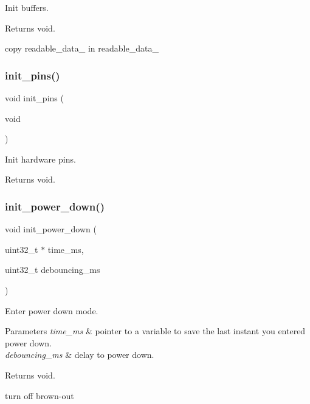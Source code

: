 Init buffers. 

\begin{DoxyReturn}{Returns}
void. 
\end{DoxyReturn}
copy readable\+\_\+data\+\_ in readable\+\_\+data\+\_ \mbox{\label{i2c-rain_8h_aa9c113540346b54d49b2a596e6ba8480}} 
\subsubsection{\texorpdfstring{init\+\_\+pins()}{init\_pins()}}
{\footnotesize\ttfamily void init\+\_\+pins (\begin{DoxyParamCaption}\item[{void}]{ }\end{DoxyParamCaption})}



Init hardware pins. 

\begin{DoxyReturn}{Returns}
void. 
\end{DoxyReturn}
\mbox{\label{i2c-rain_8h_afb98a0f07c30784284f48271ffe02b97}} 
\subsubsection{\texorpdfstring{init\+\_\+power\+\_\+down()}{init\_power\_down()}}
{\footnotesize\ttfamily void init\+\_\+power\+\_\+down (\begin{DoxyParamCaption}\item[{uint32\+\_\+t $\ast$}]{time\+\_\+ms,  }\item[{uint32\+\_\+t}]{debouncing\+\_\+ms }\end{DoxyParamCaption})}



Enter power down mode. 


\begin{DoxyParams}{Parameters}
{\em time\+\_\+ms} & pointer to a variable to save the last instant you entered power down. \\
\hline
{\em debouncing\+\_\+ms} & delay to power down. \\
\hline
\end{DoxyParams}
\begin{DoxyReturn}{Returns}
void. 
\end{DoxyReturn}
turn off brown-\/out \mbox{\label{i2c-rain_8h_a88533ad02465ce52d4e6de7b2095ec32}} 
